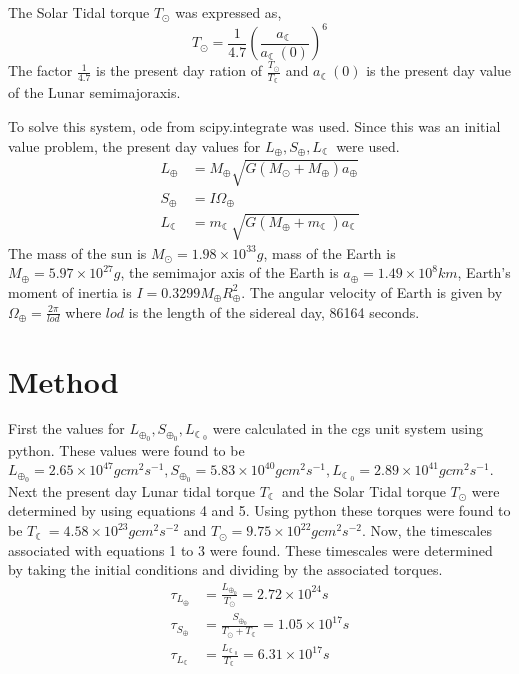 \documentclass[12pt]{article}
\begin{document}
The Solar Tidal torque $T_{\odot}$ was expressed as,
\begin{equation}
    T_{\odot} = \frac{1}{4.7} \left( \frac{a_{\leftmoon}}{a_{\leftmoon}(0)}\right)^{6}
\end{equation}
The factor $\frac{1}{4.7}$ is the present day ration of $\frac{T_{\odot}}{T_{\leftmoon}}$ and $a_{\leftmoon}(0)$ is the present day value  of the Lunar semimajoraxis.

To solve this system, ode from scipy.integrate was used. Since this was an initial value problem, the present day values for $L_{\oplus}, S_{\oplus}, L_{\leftmoon}$ were used.
\begin{align}
    L_{\oplus} &= M_{\oplus} \sqrt{G(M_{\odot} + M_{\oplus})a_{\oplus}} \\
    S_{\oplus} &= I\Omega_{\oplus} \\
    L_{\leftmoon} &= m_{\leftmoon} \sqrt{G(M_{\oplus} + m_{\leftmoon})a_{\leftmoon}}
\end{align}
The mass of the sun is $M_{\odot}=1.98 \times 10^{33}g$, mass of the Earth is $M_{\oplus}=5.97 \times 10^{27}g$, the semimajor axis of the Earth is $a_{\oplus}=1.49 \times 10^{8}km$, Earth's moment of inertia is $I=0.3299M_{\oplus}R_{\oplus}^{2}$. The angular velocity of Earth is given by $\Omega_{\oplus}=\frac{2\pi}{lod}$ where $lod$ is the length
of the sidereal day, 86164 seconds.

\section{Method}
First the values for $L_{\oplus_{0}}, S_{\oplus_{0}}, L_{\leftmoon_{0}}$ were calculated in the cgs unit system using python. These values were found to be $L_{\oplus_{0}}=2.65 \times 10^{47} gcm^{2}s^{-1}, S_{\oplus_{0}}=5.83 \times 10^{40} gcm^{2}s^{-1}, L_{\leftmoon_{0}}=2.89 \times 10^{41} gcm^{2}s^{-1}$. Next the present day Lunar tidal torque $T_{\leftmoon}$ and the Solar Tidal torque $T_{\odot}$ were determined by using equations 4 and 5. Using python these torques were found to be $T_{\leftmoon}=4.58 \times 10^{23} gcm^{2}s^{-2}$ and $T_{\odot}=9.75 \times 10^{22} gcm^{2}s^{-2}$. Now, the timescales associated with equations 1 to 3 were found. These timescales were determined by taking the initial conditions and dividing by the associated torques.
\begin{align}
    \tau_{L_{\oplus}} &= \frac{L_{\oplus_{0}}}{T_{\odot}} = 2.72 \times 10^{24} s \\
    \tau_{S_{\oplus}} &= \frac{S_{\oplus_{0}}}{T_{\odot}+T_{\leftmoon}} = 1.05 \times 10^{17} s \\
    \tau_{L_{\leftmoon}} &= \frac{L_{\leftmoon_{0}}}{T_{\leftmoon}} = 6.31 \times 10^{17} s
\end{align}
\end{document}
